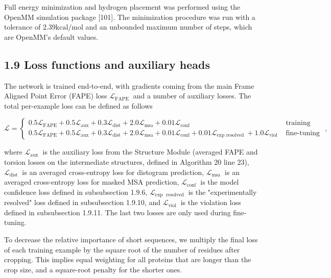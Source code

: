 \documentclass[10pt]{article}
\begin{document}
Full energy minimization and hydrogen placement was performed using the OpenMM simulation package [101]. The minimization procedure was run with a tolerance of $2.39 \mathrm{kcal} / \mathrm{mol}$ and an unbounded maximum number of steps, which are OpenMM's default values.

\subsection*{1.9 Loss functions and auxiliary heads}
The network is trained end-to-end, with gradients coming from the main Frame Aligned Point Error (FAPE) loss $\mathcal{L}_{\text {FAPE }}$ and a number of auxiliary losses. The total per-example loss can be defined as follows

\[
\mathcal{L}=\left\{\begin{array}{ll}
0.5 \mathcal{L}_{\mathrm{FAPE}}+0.5 \mathcal{L}_{\mathrm{aux}}+0.3 \mathcal{L}_{\mathrm{dist}}+2.0 \mathcal{L}_{\mathrm{msa}}+0.01 \mathcal{L}_{\mathrm{conf}} & \text { training }  \tag{7}\\
0.5 \mathcal{L}_{\mathrm{FAPE}}+0.5 \mathcal{L}_{\mathrm{aux}}+0.3 \mathcal{L}_{\mathrm{dist}}+2.0 \mathcal{L}_{\mathrm{msa}}+0.01 \mathcal{L}_{\mathrm{conf}}+0.01 \mathcal{L}_{\text {exp resolved }}+1.0 \mathcal{L}_{\mathrm{viol}} & \text { fine-tuning }
\end{array},\right.
\]

where $\mathcal{L}_{\text {aux }}$ is the auxiliary loss from the Structure Module (averaged FAPE and torsion losses on the intermediate structures, defined in Algorithm 20 line 23), $\mathcal{L}_{\text {dist }}$ is an averaged cross-entropy loss for distogram prediction, $\mathcal{L}_{\text {msa }}$ is an averaged cross-entropy loss for masked MSA prediction, $\mathcal{L}_{\text {conf }}$ is the model confidence loss defined in subsubsection 1.9.6, $\mathcal{L}_{\text {exp } \text { resolved }}$ is the "experimentally resolved" loss defined in subsubsection 1.9.10, and $\mathcal{L}_{\text {viol }}$ is the violation loss defined in subsubsection 1.9.11. The last two losses are only used during fine-tuning.

To decrease the relative importance of short sequences, we multiply the final loss of each training example by the square root of the number of residues after cropping. This implies equal weighting for all proteins that are longer than the crop size, and a square-root penalty for the shorter ones.
\end{document}
